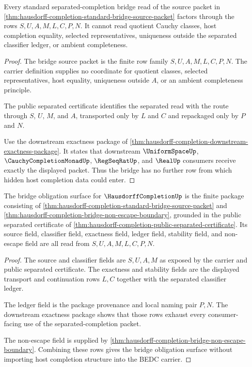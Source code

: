 \begin{theorem}
\label{thm:hausdorff-completion-bridge-non-escape-boundary}
Every standard separated-completion bridge read of the source packet in \autoref{thm:hausdorff-completion-standard-bridge-source-packet} factors through the rows $S,U,A,M,L,C,P,N$. It cannot read quotient Cauchy classes, host completion equality, selected representatives, uniqueness outside the separated classifier ledger, or ambient completeness.
\end{theorem}
\begin{proof}
The bridge source packet is the finite row family $S,U,A,M,L,C,P,N$. The carrier definition supplies no coordinate for quotient classes, selected representatives, host equality, uniqueness outside $A$, or an ambient completeness principle.

The public separated certificate identifies the separated read with the route through $S$, $U$, $M$, and $A$, transported only by $L$ and $C$ and repackaged only by $P$ and $N$.

Use the downstream exactness package of \autoref{thm:hausdorff-completion-downstream-exactness-package}. It states that downstream $\UniformSpaceUp$, $\CauchyCompletionMonadUp$, $\RegSeqRatUp$, and $\RealUp$ consumers receive exactly the displayed packet. Thus the bridge has no further row from which hidden host completion data could enter.
\end{proof}

\begin{theorem}
\label{thm:hausdorff-completion-standard-bridge-obligation-package}
The bridge obligation surface for $\HausdorffCompletionUp$ is the finite package consisting of \autoref{thm:hausdorff-completion-standard-bridge-source-packet} and \autoref{thm:hausdorff-completion-bridge-non-escape-boundary}, grounded in the public separated certificate of \autoref{thm:hausdorff-completion-public-separated-certificate}. Its source field, classifier field, exactness field, ledger field, stability field, and non-escape field are all read from $S,U,A,M,L,C,P,N$.
\end{theorem}
\begin{proof}
The source and classifier fields are $S,U,A,M$ as exposed by the carrier and public separated certificate. The exactness and stability fields are the displayed transport and continuation rows $L,C$ together with the separated classifier ledger.

The ledger field is the package provenance and local naming pair $P,N$. The downstream exactness package shows that those rows exhaust every consumer-facing use of the separated-completion packet.

The non-escape field is supplied by \autoref{thm:hausdorff-completion-bridge-non-escape-boundary}. Combining these rows gives the bridge obligation surface without importing host completion structure into the BEDC carrier.
\end{proof}


